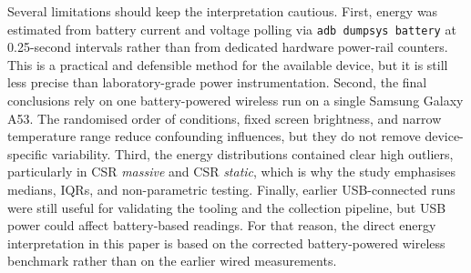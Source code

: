 Several limitations should keep the interpretation cautious. First, energy was estimated from battery current and voltage polling via \texttt{adb dumpsys battery} at 0.25-second intervals rather than from dedicated hardware power-rail counters. This is a practical and defensible method for the available device, but it is still less precise than laboratory-grade power instrumentation. Second, the final conclusions rely on one battery-powered wireless run on a single Samsung Galaxy A53. The randomised order of conditions, fixed screen brightness, and narrow temperature range reduce confounding influences, but they do not remove device-specific variability. Third, the energy distributions contained clear high outliers, particularly in CSR \textit{massive} and CSR \textit{static}, which is why the study emphasises medians, IQRs, and non-parametric testing. Finally, earlier USB-connected runs were still useful for validating the tooling and the collection pipeline, but USB power could affect battery-based readings. For that reason, the direct energy interpretation in this paper is based on the corrected battery-powered wireless benchmark rather than on the earlier wired measurements.
